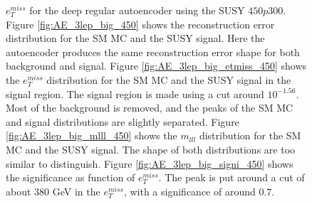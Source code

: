 \begin{figure}[H]
{    $e_T^{miss}$ for the deep regular autoencoder using the SUSY $450p300$. Figure \ref{fig:AE_3lep_big_450} shows the reconstruction error 
    distribution for the SM MC and the SUSY signal. Here the autoencoder produces the same reconstruction error shape for both background and 
    signal. Figure \ref{fig:AE_3lep_big_etmiss_450} shows the $e_T^{miss}$ distribution for the SM MC and the SUSY signal in the signal region. 
    The signal region is made using a cut around $10^{-1.56}$. Most of the background is removed, and the peaks of the SM MC and signal 
    distributions are slightly separated. Figure \ref{fig:AE_3lep_big_mlll_450} shows the $m_{lll}$ distribution for the SM MC and the SUSY signal. 
    The shape of both distributions are too similar to distinguish. Figure \ref{fig:AE_3lep_big_signi_450} shows the significance as function of
    $e_T^{miss}$. The peak is put around a cut of about 380 GeV in the $e_T^{miss}$, with a significance of around $0.7$.}
    \label{fig:AE_3lep_big_rec_sig_signi_450}
\end{figure}

